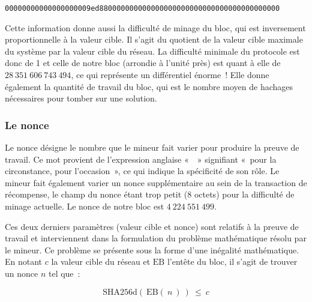 \begin{Verbatim}[fontsize=\footnotesize]
00000000000000000009ed880000000000000000000000000000000000000000
\end{Verbatim}

Cette information donne aussi la difficulté de minage du bloc, qui est inversement proportionnelle à la valeur cible. Il s'agit du quotient de la valeur cible maximale du système par la valeur cible du réseau. La difficulté minimale du protocole est donc de 1 et celle de notre bloc (arrondie à l'unité près) est quant à elle de $28~351~606~743~494$, ce qui représente un différentiel énorme~! Elle donne également la quantité de travail du bloc, qui est le nombre moyen de hachages nécessaires pour tomber sur une solution.


\subsubsection*{Le nonce} Le nonce désigne le nombre que le mineur fait varier pour produire la preuve de travail. Ce mot provient de l'expression anglaise «~~» signifiant «~pour la circonstance, pour l'occasion~», ce qui indique la spécificité de son rôle. Le mineur fait également varier un nonce supplémentaire au sein de la transaction de récompense, le champ du nonce étant trop petit (8 octets) pour la difficulté de minage actuelle. Le nonce de notre bloc est $4~224~551~499$.

Ces deux derniers paramètres (valeur cible et nonce) sont relatifs à la preuve de travail et interviennent dans la formulation du problème mathématique résolu par le mineur. Ce problème se présente sous la forme d'une inégalité mathématique. En notant $c$ la valeur cible du réseau et $\mathrm{EB}$ l'entête du bloc, il s'agit de trouver un nonce $n$ tel que~:

{ \small
\[
\mathrm{SHA256d} ( \ \mathrm{EB} ( \ n \ ) \ ) ~ \le ~ c
\]
}

